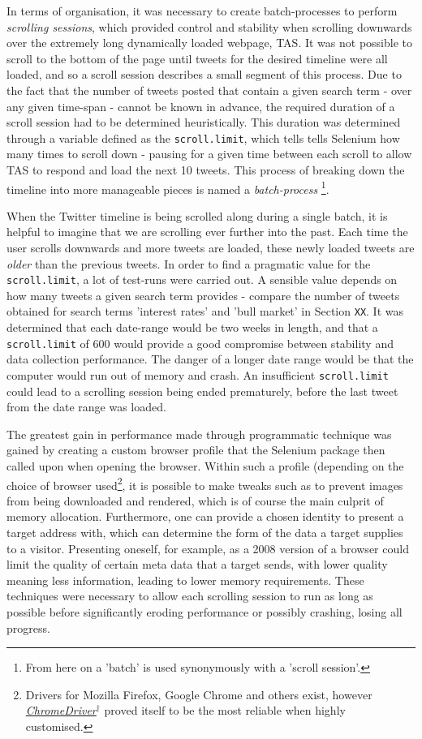 \documentclass{article}
\begin{document}
In terms of organisation, it was necessary to create batch-processes to perform \emph{scrolling sessions}, which provided control and stability when scrolling downwards over the extremely long dynamically loaded webpage, TAS. It was not possible to scroll to the bottom of the page until tweets for the desired timeline were all loaded, and so a scroll session describes a small segment of this process. Due to the fact that the number of tweets posted that contain a given search term - over any given time-span - cannot be known in advance, the required duration of a scroll session had to be determined heuristically. This duration was determined through a variable defined as the \texttt{scroll.limit}, which tells tells Selenium how many times to scroll down - pausing for a given time between each scroll to allow TAS to respond and load the next 10 tweets. This process of breaking down the timeline into more manageable pieces is named a \emph{batch-process} \footnote{From here on a 'batch' is used synonymously with a 'scroll session'.}.

When the Twitter timeline is being scrolled along during a single batch, it is helpful to imagine that we are scrolling ever further into the past. Each time the user scrolls downwards and more tweets are loaded, these newly loaded tweets are \emph{older} than the previous tweets.
In order to find a pragmatic value for the \texttt{scroll.limit}, a lot of test-runs were carried out. A sensible value depends on how many tweets a given search term provides - compare the number of tweets obtained for search terms 'interest rates' and 'bull market' in Section \texttt{XX}. It was determined that each date-range would be two weeks in length, and that a \texttt{scroll.limit} of 600 would provide a good compromise between stability and data collection performance. The danger of a longer date range would be that the computer would run out of memory and crash. An insufficient \texttt{scroll.limit} could lead to a scrolling session being ended prematurely, before the last tweet from the date range was loaded.

The greatest gain in performance made through programmatic technique was gained by creating a custom browser profile that the Selenium package then called upon when opening the browser. Within such a profile (depending on the choice of browser used\footnote{Drivers for Mozilla Firefox, Google Chrome and others exist, however \href{https://sites.google.com/a/chromium.org/chromedriver/getting-started}{\emph{ChromeDriver$^{\dag{}}$}} proved itself to be the most reliable when highly customised.}, it is possible to make tweaks such as to prevent images from being downloaded and rendered, which is of course the main culprit of memory allocation. Furthermore, one can provide a chosen identity to present a target address with, which can determine the form of the data a target supplies to a visitor. Presenting oneself, for example, as a 2008 version of a browser could limit the quality of certain meta data that a target sends, with lower quality meaning less information, leading to lower memory requirements.
These techniques were necessary to allow each scrolling session to run as long as possible before significantly eroding performance or possibly crashing, losing all progress.
\end{document}
